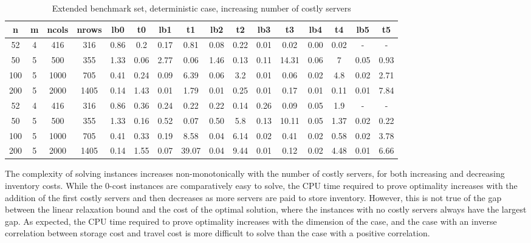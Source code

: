 \documentclass[opre,sglanonrev,11pt]{informs4}
\begin{document}
\begin{table}
	\addtolength{\tabcolsep}{-3pt}
	\footnotesize 
	\centering
	\renewcommand{\arraystretch}{1.2}
	\begin{tabular}{cccc|cc|cc|cc|cc|cc|cc}
		n & m & ncols & nrows & lb0 & t0 & lb1 & t1 & lb2 & t2 & lb3 & t3 & lb4 & t4 & lb5 & t5 \\
		\hline
		52 & 4  & 416 & 316 & 0.86 & 0.2 & 0.17 & 0.81 & 0.08 & 0.22 & 0.01 & 0.02 & 0.00 & 0.02 & - & - \\
		50 & 5  & 500 & 355 & 1.33 & 0.06 & 2.77 & 0.06 & 1.46 & 0.13 & 0.11 & 14.31 & 0.06 & 7 & 0.05 & 0.93 \\
		100 & 5 & 1000 & 705 & 0.41 & 0.24 & 0.09 & 6.39 & 0.06 & 3.2 & 0.01 & 0.06 & 0.02 & 4.8 & 0.02 & 2.71 \\
		200 & 5 & 2000 & 1405 & 0.14 & 1.43 & 0.01 & 1.79 & 0.01 & 0.25 & 0.01 & 0.17 & 0.01 & 0.11 & 0.01 & 7.84 \\
		\hline
		52 & 4  & 416 & 316 & 0.86 & 0.36 & 0.24 & 0.22 & 0.22 & 0.14 & 0.26 & 0.09 & 0.05 & 1.9 & - & - \\
		50 & 5  & 500 & 355 & 1.33 & 0.16 & 0.52 & 0.07 & 0.50 & 5.8 & 0.13 & 10.11 & 0.05 & 1.37 & 0.02 & 0.22 \\
		100 & 5 & 1000 & 705 & 0.41 & 0.33 & 0.19 & 8.58 & 0.04 & 6.14 & 0.02 & 0.41 & 0.02 & 0.58 & 0.02 & 3.78 \\
		200 & 5 & 2000 & 1405 & 0.14 & 1.55 & 0.07 & 39.07 & 0.04 & 9.44 & 0.01 & 0.12 & 0.02 & 4.48 & 0.01 & 6.66 \\
		\hline
	\end{tabular}
	\caption{Extended benchmark set, deterministic case, increasing number of costly servers}
	\label{table:extsetq}
\end{table}

The complexity of solving instances increases non-monotonically with the number of costly servers, for both increasing and decreasing inventory costs. While the 0-cost instances are comparatively easy to solve, the CPU time required to prove optimality increases with the addition of the first costly servers and then decreases as more servers are paid to store inventory. However, this is not true of the gap between the linear relaxation bound and the cost of the optimal solution, where the instances with no costly servers always have the largest gap.
As expected, the CPU time required to prove optimality increases with the dimension of the case, and the case with an inverse correlation between storage cost and travel cost is more difficult to solve than the case with a positive correlation.
\end{document}
